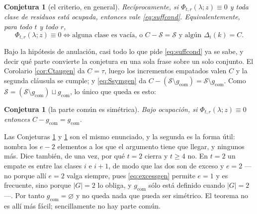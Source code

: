 \documentclass[11pt,reqno]{amsart}
\theoremstyle{plain}
\newtheorem{conjecture}[theorem]{Conjetura}
\theoremstyle{definition}
\begin{document}
\begin{conjecture}[el criterio, en general]\label{conj:general}
Recíprocamente, si $\Phi_{t,r}(\lambda;z)\equiv0$ y toda clase de residuos está ocupada, entonces vale
\eqref{eq:suffcond}. Equivalentemente, para todo $t$ y todo $r$,
\[
\Phi_{t,r}(\lambda;z)\equiv0
\iff
\text{alguna clase es vacía, o } C-\mathcal{S}=\mathcal{S}\text{ y algún }\Delta_i(k)=C .
\]
\end{conjecture}

\noindent Bajo la hipótesis de anulación, casi todo lo que pide \eqref{eq:suffcond} ya se sabe, y
decir qué parte convierte la conjetura en una sola frase sobre un solo conjunto. El Corolario
\ref{cor:Ctaugen} da $C=\tau$, luego los incrementos empatados valen $C$ y la segunda cláusula se
cumple; y \eqref{eq:Ssymgen} da $C-(\mathcal{S}\setminus g_{\mathrm{com}})=\mathcal{S}\setminus
g_{\mathrm{com}}$. Como $\mathcal{S}=(\mathcal{S}\setminus g_{\mathrm{com}})\sqcup g_{\mathrm{com}}$,
lo único que queda es esto:

\begin{conjecture}[la parte común es simétrica]\label{conj:gcom}
Bajo ocupación, si $\Phi_{t,r}(\lambda;z)\equiv0$ entonces $C-g_{\mathrm{com}}=g_{\mathrm{com}}$.
\end{conjecture}

\noindent Las Conjeturas \ref{conj:general} y \ref{conj:gcom} son el mismo enunciado, y la segunda es
la forma útil: nombra los $e-2$ elementos a los que el argumento tiene que llegar, y ningunos más.
Dice también, de una vez, por qué $t=2$ cierra y $t\ge4$ no. En $t=2$ un empate es entre las clases
$i$ e $i+1$, de modo que las dos son de exceso y $e=2$ ---no porque allí $e=2$ valga siempre, pues
\eqref{eq:excessgen} permite $e=1$ y es frecuente, sino porque $|G|=2$ lo obliga, y
$g_{\mathrm{com}}$ sólo está definido cuando $|G|=2$---. Por tanto $g_{\mathrm{com}}=\varnothing$ y
no queda nada que pueda ser simétrico. El teorema no es allí más
fácil; sencillamente no hay parte común.
\end{document}
